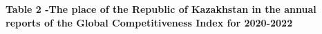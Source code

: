 {{{\bfseries Table 2 -The place of the Republic of Kazakhstan in the annual
reports of the Global Competitiveness Index for 2020-2022}

}}
